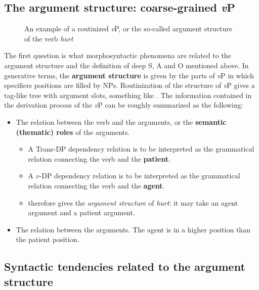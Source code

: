 \documentclass{article}
\newcommand*{\concept}[1]{\textbf{#1}}
\newcommand*{\term}[1]{\emph{#1}}
\newcommand*{\vP}{\textit{v}P}
\begin{document}
\subsection{The argument structure: coarse-grained \vP}\label{sec:vp-coarse-grain}

\begin{figure}
    \centering
    
    \caption{An example of a routinized \vP, or the so-called argument structure of the verb \term{hurt}}
    \label{fig:example-argument-structure}
\end{figure}

The first question is what morphosyntactic phenomena are related to 
the argument structure and
the definition of deep S, A and O mentioned above.
In generative terms, the \concept{argument structure} is given by the parts of \vP{}
in which specifiers positions are filled by NPs.
Routinization of the structure of \vP{} gives a \ac{tag}-like tree with argument slots,
something like .
The information contained in the derivation process of the \vP{} can be roughly summarized as the following:
\begin{itemize}
    \item The relation between the verb and the arguments, or 
    the \concept{semantic (thematic) roles} of the arguments. 
    \begin{itemize}
        \item A Trans-DP dependency relation is to be interpreted 
        as the grammatical relation connecting the verb and the \concept{patient}.
        \item A $v$-DP dependency relation is to be interpreted
        as the grammatical relation connecting the verb and the \concept{agent}.
        \item {} therefore gives the \emph{argument structure} of \term{hurt}:
        it may take an agent argument and a patient argument.
    \end{itemize}
    \item The relation between the arguments. The agent is in a higher position than the patient position.
\end{itemize}

\subsection{Syntactic tendencies related to the argument structure}\label{sec:sao-tendency}
\end{document}
